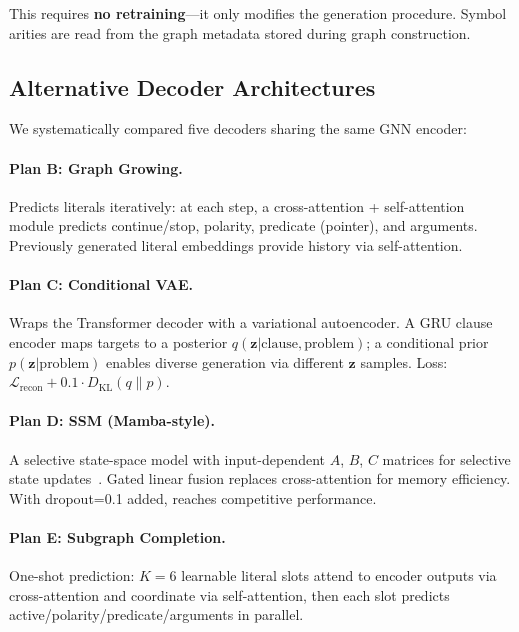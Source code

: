 \documentclass{article}
\begin{document}
This requires \textbf{no retraining}---it only modifies the generation procedure.
Symbol arities are read from the graph metadata stored during graph construction.

\subsection{Alternative Decoder Architectures}

We systematically compared five decoders sharing the same GNN encoder:

\paragraph{Plan B: Graph Growing.}
Predicts literals iteratively: at each step, a cross-attention + self-attention
module predicts continue/stop, polarity, predicate (pointer), and arguments.
Previously generated literal embeddings provide history via self-attention.

\paragraph{Plan C: Conditional VAE.}
Wraps the Transformer decoder with a variational autoencoder. A GRU clause encoder
maps targets to a posterior $q(\mathbf{z}|\text{clause}, \text{problem})$; a
conditional prior $p(\mathbf{z}|\text{problem})$ enables diverse generation
via different $\mathbf{z}$ samples. Loss: $\mathcal{L}_\text{recon} + 0.1 \cdot D_\text{KL}(q \| p)$.

\paragraph{Plan D: SSM (Mamba-style).}
A selective state-space model with input-dependent $A$, $B$, $C$ matrices for
selective state updates~\cite{gu2023mamba}. Gated linear fusion replaces
cross-attention for memory efficiency. With dropout=0.1 added, reaches competitive
performance.

\paragraph{Plan E: Subgraph Completion.}
One-shot prediction: $K{=}6$ learnable literal slots attend to encoder outputs
via cross-attention and coordinate via self-attention, then each slot predicts
active/polarity/predicate/arguments in parallel.

\end{document}
